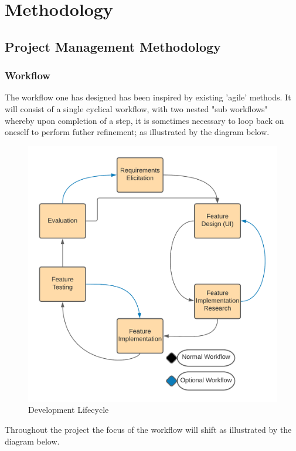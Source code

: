 \chapter{Methodology}
\label{methodology}

\section{Project Management Methodology}
  \subsection{Workflow}
  The workflow one has designed has been inspired by existing 'agile' methods. It will consist of a single cyclical workflow, with two nested "sub workflows" whereby upon completion of a step, it is sometimes necessary to loop back on oneself to perform futher refinement; as illustrated by the diagram below.
  \begin{figure}
    \begin{center}
      \includegraphics[scale=0.75]{Images/Project_Management_Methodology}
      \caption{Development Lifecycle}
      \label{fig:development lifecycle}
    \end{center}
  \end{figure}
  Throughout the project the focus of the workflow will shift as illustrated by the diagram below.

